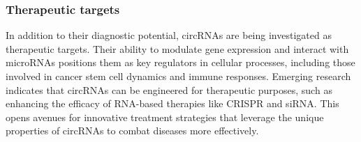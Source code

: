 \subsubsection{Therapeutic targets}
In addition to their diagnostic potential, circRNAs are being investigated as
therapeutic targets.
Their ability to modulate gene expression and interact with microRNAs positions
them as key regulators in cellular processes, including those involved in
cancer stem cell dynamics and immune responses\supercite{cheng_emerging_2023}.
Emerging research indicates that circRNAs can be engineered for therapeutic
purposes, such as enhancing the efficacy of RNA-based therapies like CRISPR and
siRNA\supercite{wesselhoeft_engineering_2018}.
This opens avenues for innovative treatment strategies that leverage the unique
properties of circRNAs to combat diseases more effectively.
